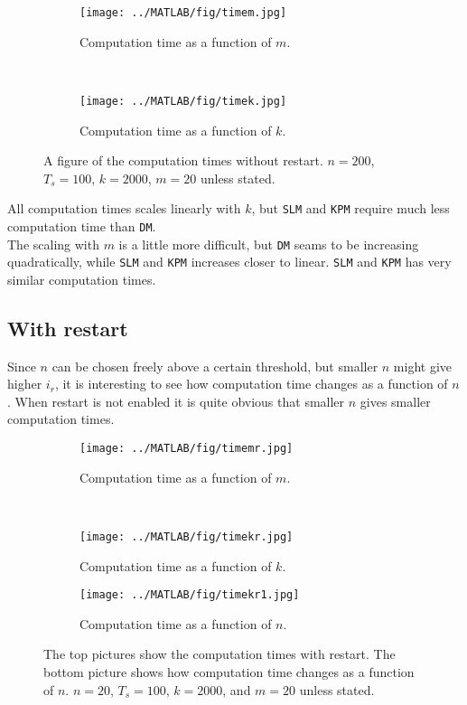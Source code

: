 \begin{figure}[H]
        \centering
        \begin{subfigure}[b]{0.45\textwidth}
                \texttt{[image: ../MATLAB/fig/timem.jpg]}
                \caption{ Computation time as a function of $m$. }
                \label{fig:timem}
        \end{subfigure}
        ~
        \begin{subfigure}[b]{0.45\textwidth}
                \texttt{[image: ../MATLAB/fig/timek.jpg]}
                \caption{ Computation time as a function of $k$. }
                \label{fig:timek}
        \end{subfigure}
        \caption{ A figure of the computation times without restart. $n = 200$, $T_s = 100$, $k = 2000$, $m = 20$ unless stated. }
        \label{fig:time0}
\end{figure}
\noindent All computation times scales linearly with $k$, but \texttt{SLM} and \texttt{KPM} require much less computation time than \texttt{DM}. \\
The scaling with $m$ is a little more difficult, but \texttt{DM} seams to be increasing quadratically, while \texttt{SLM} and \texttt{KPM} increases closer to linear. \texttt{SLM} and \texttt{KPM} has very similar computation times.
\subsection{With restart}
Since $n$ can be chosen freely above a certain threshold, but smaller $n$ might give higher $i_r$, it is interesting to see how computation time changes as a function of $n$. When restart is not enabled it is quite obvious that smaller $n$ gives smaller computation times.\\
\begin{figure}[H]
        \centering
        \begin{subfigure}[b]{0.45\textwidth}
                \texttt{[image: ../MATLAB/fig/timemr.jpg]}
                \caption{ Computation time as a function of $m$. }
                \label{fig:timemr}
        \end{subfigure}
        ~
        \begin{subfigure}[b]{0.45\textwidth}
                \texttt{[image: ../MATLAB/fig/timekr.jpg]}
                \caption{ Computation time as a function of $k$. }
                \label{fig:timekr}
        \end{subfigure}
        
        \begin{subfigure}[b]{0.45\textwidth}
                \texttt{[image: ../MATLAB/fig/timekr1.jpg]}
                \caption{ Computation time as a function of $n$. }
                \label{fig:timekr1}
        \end{subfigure}        
        
        \caption{ The top pictures show the computation times with restart. The bottom picture shows how computation time changes as a function of $n$. $n = 20$, $T_s = 100$, $k = 2000$, and $m = 20$ unless stated. }
        \label{fig:time1}
\end{figure}

